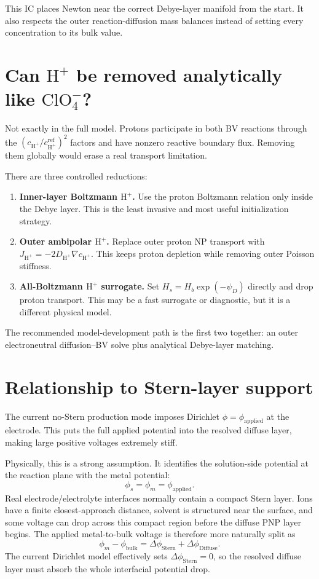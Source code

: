 \documentclass[11pt]{article}
\newcommand{\HH}{\mathrm{H}^{+}}
\newcommand{\ClO}{\mathrm{ClO}_4^{-}}
\begin{document}
This IC places Newton near the correct Debye-layer manifold from the start.
It also respects the outer reaction-diffusion mass balances instead of
setting every concentration to its bulk value.

\section{\texorpdfstring{Can \(\HH\) be removed analytically like \(\ClO\)?}{Can H+ be removed analytically like ClO4-?}}

Not exactly in the full model. Protons participate in both BV reactions
through the \((c_{\HH}/c_{\HH}^{\mathrm{ref}})^2\) factors and have nonzero
reactive boundary flux. Removing them globally would erase a real transport
limitation.

There are three controlled reductions:
\begin{enumerate}
  \item \textbf{Inner-layer Boltzmann \(\HH\).} Use the proton Boltzmann
        relation only inside the Debye layer. This is the least invasive and
        most useful initialization strategy.
  \item \textbf{Outer ambipolar \(\HH\).} Replace outer proton NP transport
        with \(J_{\HH}=-2D_{\HH}\nabla c_{\HH}\). This keeps proton depletion
        while removing outer Poisson stiffness.
  \item \textbf{All-Boltzmann \(\HH\) surrogate.} Set
        \(H_s=H_b\exp(-\psi_D)\) directly and drop proton transport. This may
        be a fast surrogate or diagnostic, but it is a different physical
        model.
\end{enumerate}
The recommended model-development path is the first two together: an outer
electroneutral diffusion--BV solve plus analytical Debye-layer matching.

\section{Relationship to Stern-layer support}

The current no-Stern production mode imposes Dirichlet
\(\phi=\phi_{\mathrm{applied}}\) at the electrode. This puts the full applied
potential into the resolved diffuse layer, making large positive voltages
extremely stiff.

Physically, this is a strong assumption. It identifies the solution-side
potential at the reaction plane with the metal potential:
\[
  \phi_s = \phi_m = \phi_{\mathrm{applied}}.
\]
Real electrode/electrolyte interfaces normally contain a compact Stern layer.
Ions have a finite closest-approach distance, solvent is structured near the
surface, and some voltage can drop across this compact region before the
diffuse PNP layer begins. The applied metal-to-bulk voltage is therefore more
naturally split as
\[
  \phi_m-\phi_{\mathrm{bulk}}
  =
  \Delta\phi_{\mathrm{Stern}}
  +
  \Delta\phi_{\mathrm{Diffuse}}.
\]
The current Dirichlet model effectively sets
\(\Delta\phi_{\mathrm{Stern}}=0\), so the resolved diffuse layer must absorb
the whole interfacial potential drop.
\end{document}
